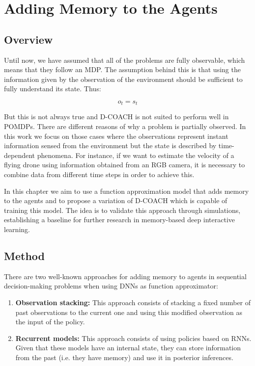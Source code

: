 \chapter{Adding Memory to the Agents}
\section{Overview}
Until now, we have assumed that all of the problems are fully observable, which means that they follow an MDP. The assumption behind this is that using the information given by the observation of the environment should be sufficient to fully understand its state. Thus:

\begin{equation}
    o_{t} = s_{t}
\end{equation}

But this is not always true and D-COACH is not suited to perform well in POMDPs. There are different reasons of why a problem is partially observed. In this work we focus on those cases where the observations represent instant information sensed from the environment but the state is described by time-dependent phenomena. For instance, if we want to estimate the velocity of a flying drone using information obtained from an RGB camera, it is necessary to combine data from different time steps in order to achieve this. 

In this chapter we aim to use a function approximation model that adds memory to the agents and to propose a variation of D-COACH which is capable of training this model. The idea is to validate this approach through simulations, establishing a baseline for further research in memory-based deep interactive learning.

\section{Method}
There are two well-known approaches for adding memory to agents in sequential decision-making problems when using DNNs as function approximator:

\begin{enumerate}
    \item \textbf{Observation stacking:} This approach consists of stacking a fixed number of past observations to the current one and using this modified observation as the input of the policy. 
    \item \textbf{Recurrent models:} This approach consists of using policies based on RNNs. Given that these models have an internal state, they can store information from the past (i.e. they have memory) and use it in posterior inferences. 
\end{enumerate}

